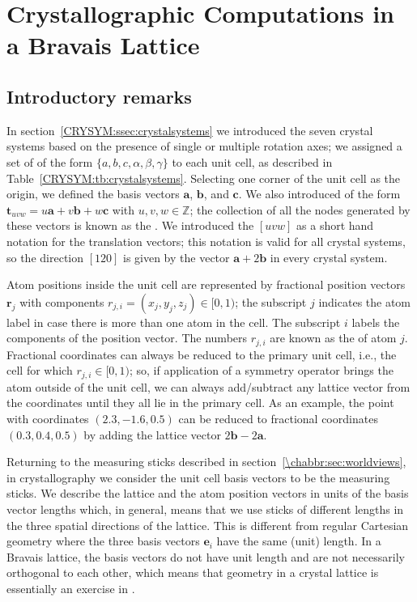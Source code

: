 \section{Crystallographic Computations in a Bravais Lattice}\label{\chabbr:sec:crystalcomputations}

\subsection{Introductory remarks}\label{\chabbr:ssec:intro}

In section~\ref{CRYSYM:ssec:crystalsystems} we introduced the seven crystal systems based on the presence of single or multiple rotation axes; we assigned a set of  of the form $\{a,b,c,\alpha,\beta,\gamma\}$ to each unit cell, as described in Table~\ref{CRYSYM:tb:crystalsystems}. Selecting one corner of the unit cell as the origin, we defined the basis vectors $\mathbf{a}$, $\mathbf{b}$, and $\mathbf{c}$. We also introduced  of the form $\mathbf{t}_{uvw} = u\mathbf{a}+v\mathbf{b}+w\mathbf{c}$ with $u,v,w\in\mathbb{Z}$; the collection of all the nodes generated by these vectors is known as the .  We introduced the  $[uvw]$ as a short hand notation for the translation vectors; this notation is valid for all crystal systems, so the direction $[120]$ is given by the vector $\mathbf{a}+2\mathbf{b}$ in every crystal system.

Atom positions inside the unit cell are represented by fractional position vectors $\mathbf{r}_j$ with components $r_{j,i}=(x_j,y_j,z_j)\in [0,1)$; the subscript $j$ indicates the atom label in case there is more than one atom in the cell.  The subscript $i$ labels the components of the position vector. The numbers $r_{j,i}$ are known as the  of atom $j$.  Fractional coordinates can always be reduced to the primary unit cell, i.e., the cell for which $r_{j,i}\in [0,1)$; so, if application of a symmetry operator brings the atom outside of the unit cell, we can always add/subtract any lattice vector from the coordinates until they all lie in the primary cell.  As an example, the point with coordinates $(2.3,-1.6,0.5)$ can be reduced to fractional coordinates $(0.3,0.4,0.5)$ by adding the lattice vector $2\mathbf{b}-2\mathbf{a}$.  

Returning to the measuring sticks described in section~\ref{\chabbr:sec:worldviews}, in crystallography we consider the unit cell basis vectors to be the measuring sticks. We describe the lattice and the atom position vectors in units of the basis vector lengths which, in general, means that we use sticks of different lengths in the three spatial directions of the lattice.  This is different from regular Cartesian geometry where the three basis vectors $\mathbf{e}_i$ have the same (unit) length. In a Bravais lattice, the basis vectors do not have unit length and are not necessarily orthogonal to each other, which means that geometry in a crystal lattice is essentially an exercise in .


